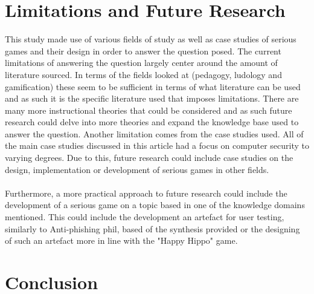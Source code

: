 \documentclass[conference]{IEEEtran}
\begin{document}
\section{Limitations and Future Research}
This study made use of various fields of study as well as case studies of serious games and their design in order to answer the question posed. The current limitations of answering the question largely center around the amount of literature sourced. In terms of the fields looked at (pedagogy, ludology and gamification) these seem to be sufficient in terms of what literature can be used and as such it is the specific literature used that imposes limitations. There are many more instructional theories that could be considered and as such future research could delve into more theories and expand the knowledge base used to answer the question. Another limitation comes from the case studies used. All of the main case studies discussed in this article had a focus on computer security to varying degrees. Due to this, future research could include case studies on the design, implementation or development of serious games in other fields.
\\\\
Furthermore, a more practical approach to future research could include the development of a serious game on a topic based in one of the knowledge domains mentioned. This could include the development an artefact for user testing, similarly to Anti-phishing phil\cite{Sheng2007}, based of the synthesis provided or the designing of such an artefact more in line with the "Happy Hippo" game\cite{allers2021children}.

\section{Conclusion}

\printbibliography
\end{document}
